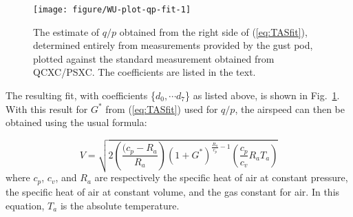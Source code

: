 \documentclass[12pt,twoside,english]{article}\usepackage[]{graphicx}\usepackage[]{color}
\newenvironment{knitrout}{}{} %
\newenvironment{lyxcode}
{\par\begin{list}{}{
\setlength{\rightmargin}{\leftmargin}
\setlength{\listparindent}{0pt}%
\raggedright
\setlength{\itemsep}{0pt}
\setlength{\parsep}{0pt}
\normalfont\ttfamily}%
 \item[]}
{\end{list}}
\begin{document}


\begin{knitrout}\footnotesize
{}\color{fgcolor}\begin{figure}

{\centering \texttt{[image: figure/WU-plot-qp-fit-1]} 

}

\caption[The estimate of $q/p$ obtained from the right side of (\ref{eq:TASfit}), determined entirely from measurements provided by the gust pod, plotted against the standard measurement obtained from QCXC/PSXC.]{The estimate of $q/p$ obtained from the right side of (\ref{eq:TASfit}), determined entirely from measurements provided by the gust pod, plotted against the standard measurement obtained from QCXC/PSXC. The coefficients are listed in the text.}\label{fig:plot-qp-fit}
\end{figure}


\end{knitrout}


The resulting fit, with coefficients \{$d_{0},\cdots d_{7}$\} as listed above, is shown in Fig.~\ref{fig:plot-qp-fit}. With this result for $G^{*}$ from (\ref{eq:TASfit}) used for $q/p$, the airspeed can then be obtained using the usual formula: 

\begin{equation}
V=\sqrt{2\left(\frac{(c_{p}-R_{a}}{R_{a}}\right)\left(1+G^{*}\right)^{\frac{R_{a}}{c_{p}}-1}\left(\frac{c_{p}}{c_{v}}R_{a}T_{a}\right)}\label{eq:TASformula} 
\end{equation}
where $c_{p}$, $c_{v}$, and $R_{a}$ are respectively the specific heat of air at constant pressure, the specific heat of air at constant volume, and the gas constant for air. In this equation, $T_{a}$ is the absolute temperature. 
\end{document}
